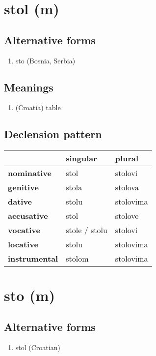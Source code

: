 \filbreak
\section{stol (m)}
\subsection*{Alternative forms}
\begin{enumerate}
\item sto (Bosnia, Serbia)
\end{enumerate}
\subsection*{Meanings}
\begin{enumerate}
\item (Croatia) table
\end{enumerate}
\subsection*{Declension pattern}
\begin{tabularx}{\linewidth}{Xll}
\toprule
{} &       singular &     plural \\
\midrule
\textbf{nominative  } &           stol &    stolovi \\
\textbf{genitive    } &          stola &    stolova \\
\textbf{dative      } &          stolu &  stolovima \\
\textbf{accusative  } &           stol &    stolove \\
\textbf{vocative    } &  stole / stolu &    stolovi \\
\textbf{locative    } &          stolu &  stolovima \\
\textbf{instrumental} &         stolom &  stolovima \\
\bottomrule
\end{tabularx}

\filbreak
\section{sto (m)}
\subsection*{Alternative forms}
\begin{enumerate}
\item stol (Croatian)
\end{enumerate}
